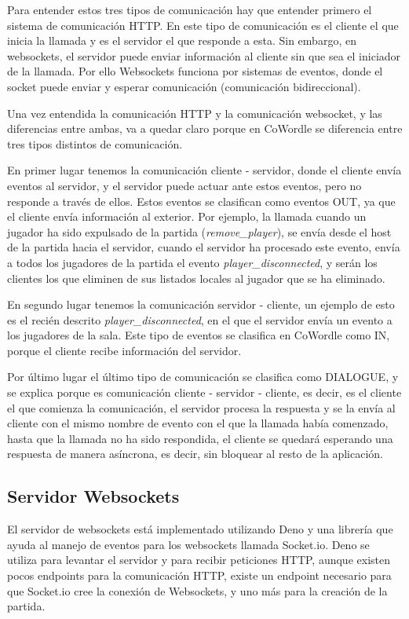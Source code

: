 Para entender estos tres tipos de comunicación hay que entender primero el sistema de comunicación HTTP. En este tipo de comunicación es el cliente el que inicia la llamada y es el servidor el que responde a esta. Sin embargo, en websockets, el servidor puede enviar información al cliente sin que sea  el iniciador de la llamada. Por ello Websockets funciona por sistemas de eventos, donde el socket puede enviar y esperar comunicación (comunicación bidireccional).

Una vez entendida la comunicación HTTP y la comunicación websocket, y las diferencias entre ambas, va a quedar claro porque en CoWordle se diferencia entre tres tipos distintos de comunicación.

En primer lugar tenemos la comunicación cliente - servidor, donde el cliente envía eventos al servidor, y el servidor puede actuar ante estos eventos, pero no responde a través de ellos. 
Estos eventos se clasifican como eventos OUT, ya que el cliente envía información al exterior. Por ejemplo, la llamada cuando un jugador ha sido expulsado de la partida (\textit{remove\_player}), se envía desde el host de la partida hacia el servidor, cuando el servidor ha procesado este evento, envía a todos los jugadores de la partida el evento \textit{player\_disconnected}, y serán los clientes los que eliminen de sus listados locales al jugador que se ha eliminado.

En segundo lugar tenemos la comunicación servidor - cliente, un ejemplo de esto es el recién descrito \textit{player\_disconnected}, en el que el servidor envía un evento a los jugadores de la sala. Este tipo de eventos se clasifica en CoWordle como IN, porque el cliente recibe información del servidor.

Por último lugar el último tipo de comunicación se clasifica como DIALOGUE, y se explica porque  es comunicación cliente - servidor - cliente, es decir, es el cliente el que comienza la comunicación, el servidor procesa la respuesta y se la envía al cliente con el mismo nombre de evento con el que la llamada había comenzado, hasta que la llamada no ha sido respondida, el cliente se quedará esperando una respuesta de manera asíncrona, es decir, sin bloquear al resto de la aplicación.

\subsection{Servidor Websockets}
El servidor de websockets está implementado utilizando Deno y una librería que ayuda al manejo de eventos para los websockets llamada Socket.io. Deno se utiliza para levantar el servidor y para recibir peticiones HTTP, aunque existen pocos endpoints para la comunicación HTTP, existe un endpoint necesario para que Socket.io cree la conexión de Websockets, y uno más para la creación de la partida. 

